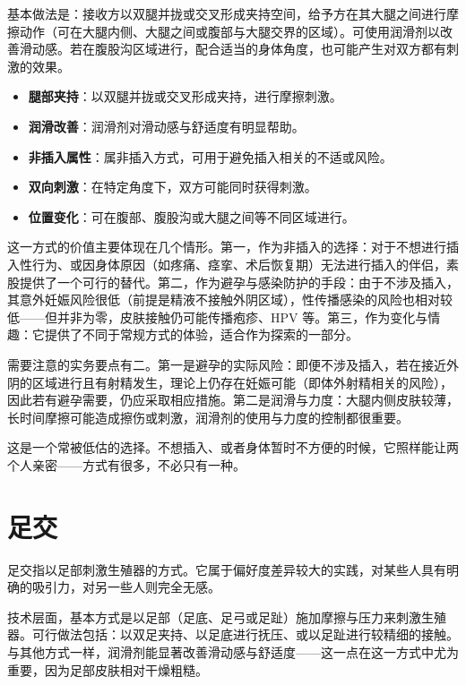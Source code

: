 \documentclass[12pt,UTF8]{ctexbook}
\begin{document}
基本做法是：接收方以双腿并拢或交叉形成夹持空间，给予方在其大腿之间进行摩擦动作（可在大腿内侧、大腿之间或腹部与大腿交界的区域）。可使用润滑剂以改善滑动感。若在腹股沟区域进行，配合适当的身体角度，也可能产生对双方都有刺激的效果。

\begin{itemize}
	\item \textbf{腿部夹持}：以双腿并拢或交叉形成夹持，进行摩擦刺激。
	\item \textbf{润滑改善}：润滑剂对滑动感与舒适度有明显帮助。
	\item \textbf{非插入属性}：属非插入方式，可用于避免插入相关的不适或风险。
	\item \textbf{双向刺激}：在特定角度下，双方可能同时获得刺激。
	\item \textbf{位置变化}：可在腹部、腹股沟或大腿之间等不同区域进行。
\end{itemize}

这一方式的价值主要体现在几个情形。第一，作为非插入的选择：对于不想进行插入性行为、或因身体原因（如疼痛、痉挛、术后恢复期）无法进行插入的伴侣，素股提供了一个可行的替代。第二，作为避孕与感染防护的手段：由于不涉及插入，其意外妊娠风险很低（前提是精液不接触外阴区域），性传播感染的风险也相对较低——但并非为零，皮肤接触仍可能传播疱疹、HPV 等。第三，作为变化与情趣：它提供了不同于常规方式的体验，适合作为探索的一部分。

需要注意的实务要点有二。第一是避孕的实际风险：即便不涉及插入，若在接近外阴的区域进行且有射精发生，理论上仍存在妊娠可能（即体外射精相关的风险），因此若有避孕需要，仍应采取相应措施。第二是润滑与力度：大腿内侧皮肤较薄，长时间摩擦可能造成擦伤或刺激，润滑剂的使用与力度的控制都很重要。

\begin{tcolorbox}[colback=pink!5!white,colframe=red!50!black,title=贴心小叮咛]
	这是一个常被低估的选择。不想插入、或者身体暂时不方便的时候，它照样能让两个人亲密——方式有很多，不必只有一种。
\end{tcolorbox}

\section{足交}

足交指以足部刺激生殖器的方式。它属于偏好度差异较大的实践，对某些人具有明确的吸引力，对另一些人则完全无感。

技术层面，基本方式是以足部（足底、足弓或足趾）施加摩擦与压力来刺激生殖器。可行做法包括：以双足夹持、以足底进行抚压、或以足趾进行较精细的接触。与其他方式一样，润滑剂能显著改善滑动感与舒适度——这一点在这一方式中尤为重要，因为足部皮肤相对干燥粗糙。
\end{document}
